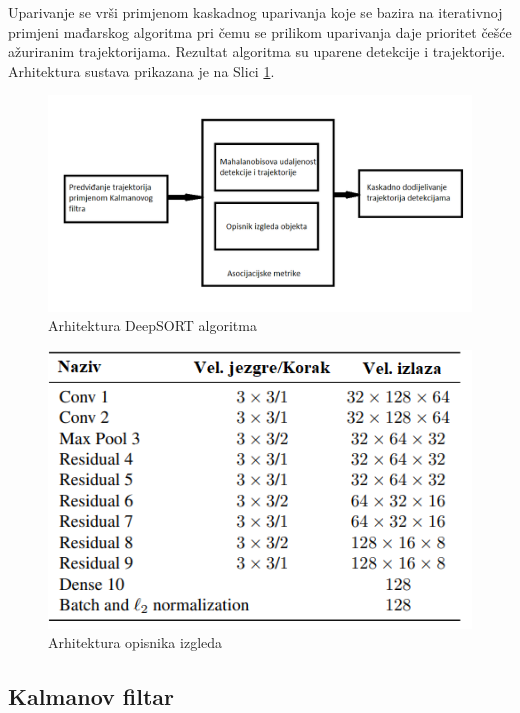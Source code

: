 \documentclass[times, utf8, seminar, numeric]{fer}
\begin{document}
Uparivanje se vrši primjenom kaskadnog uparivanja koje se bazira na iterativnoj primjeni mađarskog algoritma pri čemu se prilikom uparivanja daje prioritet češće ažuriranim trajektorijama. Rezultat algoritma su uparene detekcije i trajektorije. Arhitektura sustava prikazana je na Slici \ref{fig:deep_sort_arch}.




\begin{figure}
	\centering
	\includegraphics[width=\linewidth]{slike/deep_sort_arch.png}
	\caption {Arhitektura DeepSORT algoritma}
	\label{fig:deep_sort_arch}	
\end{figure}

\begin{figure}
	\centering
	\includegraphics[scale=0.5]{slike/deep_sort_net_arch.png}
	\caption {Arhitektura opisnika izgleda}
	\label{fig:deep_sort_net_arch}
\end{figure}


\subsection{Kalmanov filtar}
\end{document}
